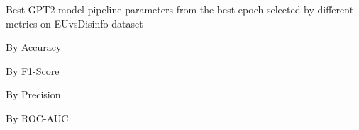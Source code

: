 \begin{table}[!htbp]
    \caption{Best GPT2 model pipeline parameters from the best epoch selected by different metrics on EUvsDisinfo dataset}
    \label{tab:euvsdisinfo_gpt2_pipeline_params}
    \centering

    \begin{subtable}[t]{0.48\linewidth}
        \scriptsize
        \caption{By Accuracy}
        
    \end{subtable}
    \hfill
    \begin{subtable}[t]{0.48\linewidth}
        \scriptsize
        \caption{By F1-Score}
        
    \end{subtable}

    \vspace{1em}

    \begin{subtable}[t]{0.48\linewidth}
        \scriptsize
        \caption{By Precision}
        
    \end{subtable}
    \hfill
    \begin{subtable}[t]{0.48\linewidth}
        \scriptsize
        \caption{By ROC-AUC}
        
    \end{subtable}

\end{table}